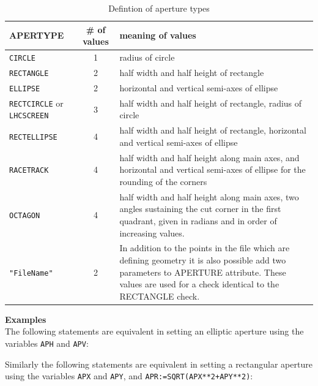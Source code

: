 \begin{table}[ht]
  \caption{Defintion of aperture types}
  \label{table:apertype}
  \vspace{1ex}
  \begin{tabular}{|l | c | p{7.5cm}|}
    \hline 
    \textbf{APERTYPE} & \textbf{\# of values} & \textbf{meaning of values}\\
    \hline
    \texttt{CIRCLE} & 1 &  radius of circle \\
    \hline
    \texttt{RECTANGLE} & 2 & half width and half height of rectangle\\ 
    \hline
    \texttt{ELLIPSE} & 2 & horizontal and vertical semi-axes of ellipse \\  
    \hline
    \texttt{RECTCIRCLE} or \texttt{LHCSCREEN} & 3 & half width and half height 
    of rectangle, radius of circle\\
    \hline
    \texttt{RECTELLIPSE} & 4 & half width and half height of rectangle, 
    horizontal and vertical semi-axes of ellipse \\
    \hline
    \texttt{RACETRACK} & 4 & half width and half height along main axes, 
    and horizontal and vertical semi-axes of ellipse for the rounding 
    of the corners \\
    \hline
    \texttt{OCTAGON} & 4 & half width and half height along main axes, 
    two angles sustaining the cut corner in the first quadrant, 
    given in radians and in order of increasing values. \\
    \hline
    \texttt{"FileName"} & 2 & In addition to the points in the file which
    are defining geometry it is also possible add two parameters
    to APERTURE attribute. These values are used for a check identical to 
    the RECTANGLE check. \\    
    \hline
  \end{tabular}
\end{table}

\vskip 5mm

\textbf{Examples}\\
The following statements are equivalent in setting an elliptic aperture 
using the variables \texttt{APH} and \texttt{APV}:

Similarly the following statements are equivalent in setting a rectangular 
aperture using the variables \texttt{APX} and \texttt{APY}, 
and \texttt{APR:=SQRT(APX**2+APY**2)}:

